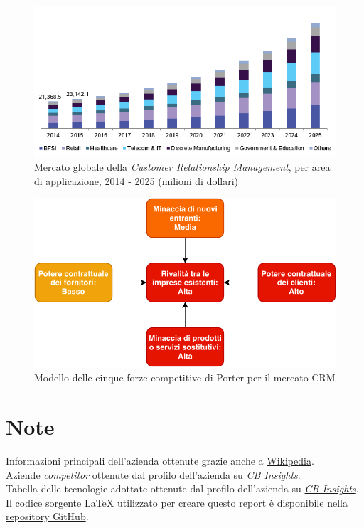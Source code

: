 \documentclass[a4paper, 11pt]{article}
\begin{document}
\newpage
\null
\vfill
\begin{figure}[h]
\includegraphics[width=\textwidth]{images/global-customer-relationship-management-market.png}
\caption{Mercato globale della \textit{Customer Relationship Management}, per area di applicazione, 2014 - 2025 (milioni di dollari) \cite{GVR}}
\label{fig:crescitacrm}
\end{figure}
\vfill

\newpage
\null
\vfill
\begin{figure}[h]
\includegraphics[width=\textwidth]{images/porterintercom.pdf}
\caption{Modello delle cinque forze competitive di Porter per il mercato CRM \cite{GVR}}
\label{fig:porterintercom}
\end{figure}
\vfill

\newpage
\section*{Note}
Informazioni principali dell'azienda ottenute grazie anche a \href{www.wikipedia.org}{Wikipedia}.\\
Aziende \textit{competitor} ottenute dal profilo dell'azienda su \href{www.cbinsights.com}{\textit{CB Insights}}.\\
Tabella delle tecnologie adottate ottenute dal profilo dell'azienda su  \href{www.cbinsights.com}{\textit{CB Insights}}.\\
Il codice sorgente LaTeX utilizzato per creare questo report è disponibile nella \href{https://github.com/candeogi/HomeworkGSO}{repository GitHub}.\\
\end{document}

